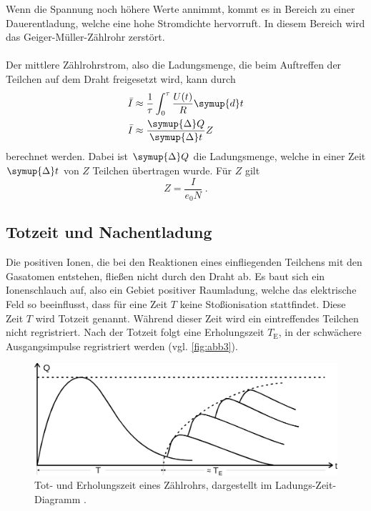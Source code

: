     Wenn die Spannung noch höhere Werte annimmt,
    kommt es in Bereich  zu einer Dauerentladung,
    welche eine hohe Stromdichte hervorruft.
    In diesem Bereich wird das Geiger-Müller-Zählrohr zerstört.\\
    \\
    Der mittlere Zählrohrstrom, also die Ladungsmenge,
    die beim Auftreffen der Teilchen auf dem Draht freigesetzt wird, kann durch
    \begin{align}
        \bar{I} &\approx \frac{1}{\tau} \int_0^{\tau}{\frac{U(t)}{R}} \symup{d}t \\
        \bar{I} &\approx \frac{\symup{\Delta}Q}{\symup{\Delta}t} Z
    \end{align}
    berechnet werden.
    Dabei ist $\symup{\Delta}Q$ die Ladungsmenge,
    welche in einer Zeit $\symup{\Delta}t$ von $Z$ Teilchen übertragen wurde.
    Für $Z$ gilt
    \begin{equation}
      \label{eqn:Teilchenzahl}
      Z = \frac{I}{e_0 N} \; .
    \end{equation}

\subsection{Totzeit und Nachentladung}

    Die positiven Ionen,
    die bei den Reaktionen eines einfliegenden Teilchens mit den Gasatomen entstehen,
    fließen nicht durch den Draht ab.
    Es baut sich ein Ionenschlauch auf, also ein Gebiet positiver Raumladung,
    welche das elektrische Feld so beeinflusst, dass für eine Zeit $T$ keine Stoßionisation stattfindet.
    Diese Zeit $T$ wird Totzeit genannt.
    Während dieser Zeit wird ein eintreffendes Teilchen nicht regristriert.
    Nach der Totzeit folgt eine Erholungszeit $T_\text{E}$,
    in der schwächere Ausgangsimpulse regristriert werden (vgl. \autoref{fig:abb3}).

    \begin{figure}
      \centering
      \includegraphics[width=\textwidth]{content/img/V703_Abb3.jpg}
      \caption{Tot- und Erholungszeit eines Zählrohrs, dargestellt im Ladungs-Zeit-Diagramm \cite{versuchsanleitung}.}
      \label{fig:abb3}
    \end{figure}

